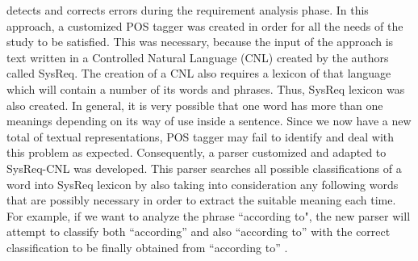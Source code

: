 detects and corrects errors during the requirement analysis phase. In this approach, a customized POS tagger was created in order for all the 
needs of the study to be satisfied. This was necessary, because the input of the approach is text written in a Controlled Natural Language (CNL) 
created by the authors called SysReq. The creation of a CNL also requires a lexicon of that language which will contain a number of its 
words and phrases. Thus, SysReq lexicon was also created. In general, it is very possible that one word has more than one meanings depending 
on its way of use inside a sentence. Since we now have a new total of textual representations, POS tagger may fail to identify and deal with 
this problem as expected. Consequently, a parser customized and adapted to SysReq-CNL was developed. This parser searches all possible 
classifications of a word into SysReq lexicon by also taking into consideration any following words that are possibly necessary in order to 
extract the suitable meaning each time. For example, if we want to analyze the phrase ``according to", the new parser will attempt to classify 
both ``according'' and also ``according to'' with the correct classification to be finally obtained from ``according to'' \cite{carvalho2014nat2testscr}.\\

